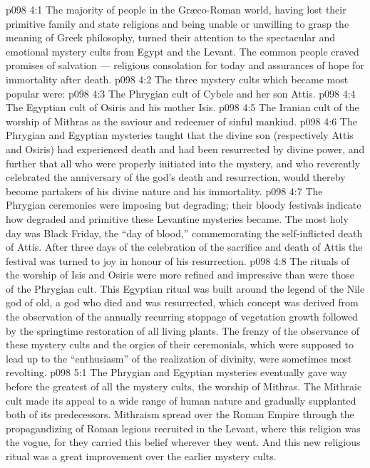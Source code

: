 \vs p098 4:1 The majority of people in the Gr\ae co\hyp{}Roman world, having lost their primitive family and state religions and being unable or unwilling to grasp the meaning of Greek philosophy, turned their attention to the spectacular and emotional mystery cults from Egypt and the Levant. The common people craved promises of salvation --- religious consolation for today and assurances of hope for immortality after death.
\vs p098 4:2 The three mystery cults which became most popular were:
\vs p098 4:3 \bibnobreakspace The Phrygian cult of Cybele and her son Attis.
\vs p098 4:4 \bibnobreakspace The Egyptian cult of Osiris and his mother Isis.
\vs p098 4:5 \bibnobreakspace The Iranian cult of the worship of Mithras as the saviour and redeemer of sinful mankind.
\vs p098 4:6 \pc The Phrygian and Egyptian mysteries taught that the divine son (respectively Attis and Osiris) had experienced death and had been resurrected by divine power, and further that all who were properly initiated into the mystery, and who reverently celebrated the anniversary of the god’s death and resurrection, would thereby become partakers of his divine nature and his immortality.
\vs p098 4:7 \pc The Phrygian ceremonies were imposing but degrading; their bloody festivals indicate how degraded and primitive these Levantine mysteries became. The most holy day was Black Friday, the “day of blood,” commemorating the self\hyp{}inflicted death of Attis. After three days of the celebration of the sacrifice and death of Attis the festival was turned to joy in honour of his resurrection.
\vs p098 4:8 The rituals of the worship of Isis and Osiris were more refined and impressive than were those of the Phrygian cult. This Egyptian ritual was built around the legend of the Nile god of old, a god who died and was resurrected, which concept was derived from the observation of the annually recurring stoppage of vegetation growth followed by the springtime restoration of all living plants. The frenzy of the observance of these mystery cults and the orgies of their ceremonials, which were supposed to lead up to the “enthusiasm” of the realization of divinity, were sometimes most revolting.
\vs p098 5:1 The Phrygian and Egyptian mysteries eventually gave way before the greatest of all the mystery cults, the worship of Mithras. The Mithraic cult made its appeal to a wide range of human nature and gradually supplanted both of its predecessors. Mithraism spread over the Roman Empire through the propagandizing of Roman legions recruited in the Levant, where this religion was the vogue, for they carried this belief wherever they went. And this new religious ritual was a great improvement over the earlier mystery cults.
